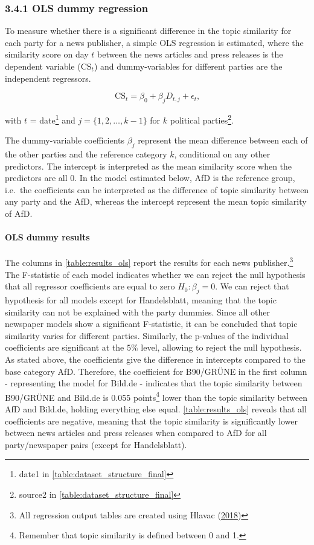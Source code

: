 \documentclass[
  12pt,
]{article}
\begin{document}
\hypertarget{ols-dummy-regression}{%
\subsubsection{3.4.1 OLS dummy regression}\label{ols-dummy-regression}}

To measure whether there is a significant difference in the topic
similarity for each party for a news publisher, a simple OLS regression
is estimated, where the similarity score on day \(t\) between the news
articles and press releases is the dependent variable
(\(\text{CS}_{t}\)) and dummy-variables for different parties are the
independent regressors.

\[
\text{CS}_{t}=\beta_0+\beta_jD_{t,j}+\epsilon_t\text{,}
\]

with \(t\) = date\footnote{date1 in
  \autoref{table:dataset_structure_final}} and \(j=\{1,2,\dots,k-1\}\)
for \(k\) political parties\footnote{source2 in
  \autoref{table:dataset_structure_final}}.

The dummy-variable coefficients \(\beta_{j}\) represent the mean
difference between each of the other parties and the reference category
\(k\), conditional on any other predictors. The intercept is interpreted
as the mean similarity score when the predictors are all 0. In the model
estimated below, AfD is the reference group, i.e.~the coefficients can
be interpreted as the difference of topic similarity between any party
and the AfD, whereas the intercept represent the mean topic similarity
of AfD.

\hypertarget{ols-dummy-results}{%
\paragraph{OLS dummy results}\label{ols-dummy-results}}

The columns in \autoref{table:results_ols} report the results for each
news publisher.\footnote{All regression output tables are created using
  Hlavac (\protect\hyperlink{ref-hlavac_stargazer_2018}{2018})} The
F-statistic of each model indicates whether we can reject the null
hypothesis that all regressor coefficients are equal to zero
\(H_0: \beta_j=0\). We can reject that hypothesis for all models except
for Handelsblatt, meaning that the topic similarity can not be explained
with the party dummies. Since all other newspaper models show a
significant F-statistic, it can be concluded that topic similarity
varies for different parties. Similarly, the p-values of the individual
coefficients are significant at the \(5\%\) level, allowing to reject
the null hypothesis. As stated above, the coefficients give the
difference in intercepts compared to the base category AfD. Therefore,
the coefficient for B90/GRÜNE in the first column - representing the
model for Bild.de - indicates that the topic similarity between
B90/GRÜNE and Bild.de is 0.055 points\footnote{Remember that topic
  similarity is defined between 0 and 1.} lower than the topic
similarity between AfD and Bild.de, holding everything else equal.
\autoref{table:results_ols} reveals that all coefficients are negative,
meaning that the topic similarity is significantly lower between news
articles and press releases when compared to AfD for all party/newspaper
pairs (except for Handelsblatt).
\end{document}

